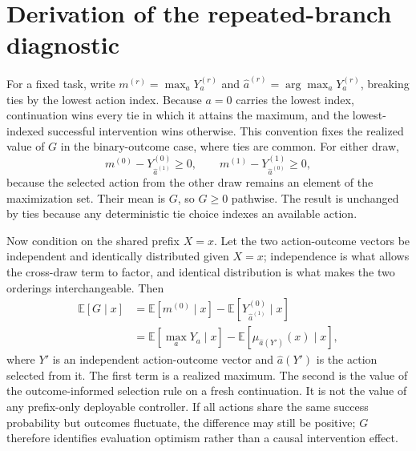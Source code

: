 \section{Derivation of the repeated-branch diagnostic}
\label{app:proof}

For a fixed task, write $m^{(r)}=\max_aY_a^{(r)}$ and $\widehat a^{(r)}=\arg\max_aY_a^{(r)}$, breaking ties by the lowest action index. Because $a=0$ carries the lowest index, continuation wins every tie in which it attains the maximum, and the lowest-indexed successful intervention wins otherwise. This convention fixes the realized value of $G$ in the binary-outcome case, where ties are common. For either draw,
\begin{equation}
m^{(0)}-Y_{\widehat a^{(1)}}^{(0)}\geq0,
\qquad
m^{(1)}-Y_{\widehat a^{(0)}}^{(1)}\geq0,
\end{equation}
because the selected action from the other draw remains an element of the maximization set. Their mean is $G$, so $G\geq0$ pathwise. The result is unchanged by ties because any deterministic tie choice indexes an available action.

Now condition on the shared prefix $X=x$. Let the two action-outcome vectors be independent and identically distributed given $X=x$; independence is what allows the cross-draw term to factor, and identical distribution is what makes the two orderings interchangeable. Then
\begin{align}
\mathbb E[G\mid x]
&=\mathbb E[m^{(0)}\mid x]
-\mathbb E[Y_{\widehat a^{(1)}}^{(0)}\mid x] \\
&=\mathbb E\!\left[\max_aY_a\mid x\right]
-\mathbb E\!\left[\mu_{\widehat a(Y')} (x)\mid x\right],
\end{align}
where $Y'$ is an independent action-outcome vector and $\widehat a(Y')$ is the action selected from it. The first term is a realized maximum. The second is the value of the outcome-informed selection rule on a fresh continuation. It is not the value of any prefix-only deployable controller. If all actions share the same success probability but outcomes fluctuate, the difference may still be positive; $G$ therefore identifies evaluation optimism rather than a causal intervention effect.

